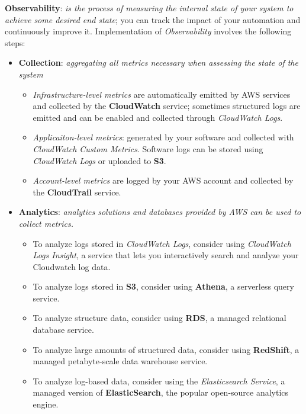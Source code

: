 \documentclass{article}
\theoremstyle{definition}
\begin{document}
\begin{itemize}
    \textbf{Observability}: \textit{is the process of measuring the internal state of your system to achieve some desired end state}; you can track the impact of your automation and continuously improve it. Implementation of \textit{Observability} involves the following steps:
    \begin{itemize}
    \item \textbf{Collection}: \textit{aggregating all metrics necessary when assessing the state of the system}
    \begin{itemize}
    \item\textit{Infrastructure-level metrics} are automatically emitted by AWS services and collected by the \textbf{CloudWatch} service; sometimes structured logs are emitted and can be enabled and collected through \textit{CloudWatch Logs}.
    \item\textit{Applicaiton-level metrics}: generated by your software and collected with \textit{CloudWatch Custom Metrics}. Software logs can be stored using \textit{CloudWatch Logs} or uploaded to \textbf{S3}.
    \item\textit{Account-level metrics} are logged by your AWS account and collected by the \textbf{CloudTrail} service.
    \end{itemize}
    
    
    \item \textbf{Analytics}: \textit{analytics solutions and databases provided by AWS can be used to collect metrics.}
    \begin{itemize}
    \item To analyze logs stored in \textit{CloudWatch Logs}, consider using \textit{CloudWatch Logs Insight}, a service that lets you interactively search and analyze your Cloudwatch log data.
    \item To analyze logs stored in \textbf{S3}, consider using \textbf{Athena}, a serverless query service.
    \item  To analyze structure data, consider using \textbf{RDS}, a managed relational database service.
    \item To analyze large amounts of structured data, consider using \textbf{RedShift}, a managed petabyte-scale data warehouse service.
    \item To analyze log-based data, consider using the \textit{Elasticsearch Service}, a managed version of \textbf{ElasticSearch}, the popular open-source analytics engine.
    \end{itemize}
    

\end{itemize}
\end{itemize}
\end{document}
